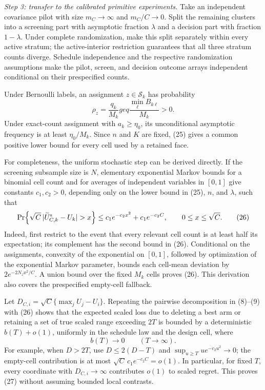 \emph{Step 3: transfer to the calibrated primitive experiments.}
Take an independent covariance pilot with size \(m_C\to\infty\) and \(m_C/C\to0\).  Split the remaining clusters into a screening part with asymptotic fraction \(\lambda\) and a decision part with fraction \(1-\lambda\).  Under complete randomization, make this split separately within every active stratum; the active-interior restriction guarantees that all three stratum counts diverge.  Schedule independence and the respective randomization assumptions make the pilot, screen, and decision outcome arrays independent conditional on their prespecified counts.

Under Bernoulli labels, an assignment \(z\in\mathcal S_k\) has probability
\[
\rho_z=\frac{q_k}{M_k}geq
\frac{\min_\ell B_{k\ell}}{M_k}>0. \tag{25}
\]
Under exact-count assignment with \(a_k\geq\eta_0\), its unconditional asymptotic frequency is at least \(\eta_0/M_k\).  Since \(n\) and \(K\) are fixed, (25) gives a common positive lower bound for every cell used by a retained face.

For completeness, the uniform stochastic step can be derived directly.  If the screening subsample size is \(N\), elementary exponential Markov bounds for a binomial cell count and for averages of independent variables in \([0,1]\) give constants \(c_1,c_2>0\), depending only on the lower bound in (25), \(n\), and \(\lambda\), such that
\[
\Pr\!\left\{\sqrt C\,|\widetilde U^{\rm s}_{C,k}-U_k|>x\right\}
\leq c_1e^{-c_2x^2}+c_1e^{-c_2C},
\qquad 0\leq x\leq\sqrt C. \tag{26}
\]
Indeed, first restrict to the event that every relevant cell count is at least half its expectation; its complement has the second bound in (26).  Conditional on the assignments, convexity of the exponential on \([0,1]\), followed by optimization of the exponential Markov parameter, bounds each cell-mean deviation by \(2e^{-2N_zx^2/C}\).  A union bound over the fixed \(M_k\) cells proves (26).  This derivation also covers the prespecified empty-cell fallback.

Let \(D_{C,i}=\sqrt C\{\max_jU_j-U_i\}\).  Repeating the pairwise decomposition in (8)--(9) with (26) shows that the expected scaled loss due to deleting a best arm or retaining a set of true scaled range exceeding \(2T\) is bounded by a deterministic \(b(T)+o(1)\), uniformly in the schedule law and the design cell, where
\[
b(T)\longrightarrow0\qquad(T\to\infty). \tag{27}
\]
For example, when \(D>2T\), use \(D\leq2(D-T)\) and
\(\sup_{u\geq T}u e^{-c_2u^2}\to0\); the empty-cell contribution is at most \(\sqrt C\,c_1e^{-c_2C}=o(1)\).  In particular, for fixed \(T\), every coordinate with \(D_{C,i}\to\infty\) contributes \(o(1)\) to scaled regret.  This proves (27) without assuming bounded local contrasts.

